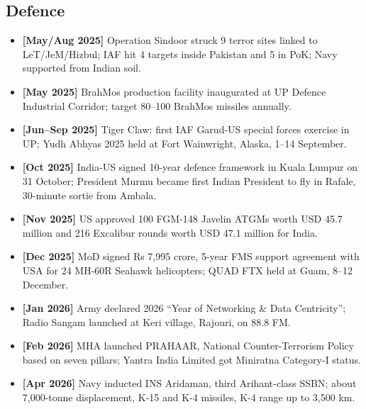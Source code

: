 \documentclass[10pt,a4paper]{article}
\newcommand{\monthtag}[1]{\textbf{[#1]}}
\newcommand{\fact}[2]{\item \monthtag{#1} #2}
\begin{document}
\subsection{Defence}
\begin{itemize}
    \fact{May/Aug 2025}{Operation Sindoor struck 9 terror sites linked to LeT/JeM/Hizbul; IAF hit 4 targets inside Pakistan and 5 in PoK; Navy supported from Indian soil.}
    \fact{May 2025}{BrahMos production facility inaugurated at UP Defence Industrial Corridor; target 80--100 BrahMos missiles annually.}
    \fact{Jun--Sep 2025}{Tiger Claw: first IAF Garud-US special forces exercise in UP; Yudh Abhyas 2025 held at Fort Wainwright, Alaska, 1--14 September.}
    \fact{Oct 2025}{India-US signed 10-year defence framework in Kuala Lumpur on 31 October; President Murmu became first Indian President to fly in Rafale, 30-minute sortie from Ambala.}
    \fact{Nov 2025}{US approved 100 FGM-148 Javelin ATGMs worth USD 45.7 million and 216 Excalibur rounds worth USD 47.1 million for India.}
    \fact{Dec 2025}{MoD signed Rs 7,995 crore, 5-year FMS support agreement with USA for 24 MH-60R Seahawk helicopters; QUAD FTX held at Guam, 8--12 December.}
    \fact{Jan 2026}{Army declared 2026 ``Year of Networking \& Data Centricity''; Radio Sangam launched at Keri village, Rajouri, on 88.8 FM.}
    \fact{Feb 2026}{MHA launched PRAHAAR, National Counter-Terrorism Policy based on seven pillars; Yantra India Limited got Miniratna Category-I status.}
    \fact{Apr 2026}{Navy inducted INS Aridaman, third Arihant-class SSBN; about 7,000-tonne displacement, K-15 and K-4 missiles, K-4 range up to 3,500 km.}
\end{itemize}
\end{document}
